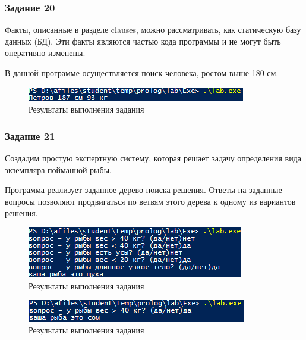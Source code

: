 \documentclass[14pt,a4paper,report]{report}
\begin{document}
\subsubsection{Задание 20}

Факты, описанные в разделе clauses, можно рассматривать, как статическую базу данных (БД). Эти факты являются частью кода программы и не могут быть оперативно изменены. 

В данной программе осуществляется поиск человека, ростом выше 180 см. 



\begin{figure}[h!]
	\centering
	\includegraphics[scale = 1.0]{images/d20.png}
	\caption{Результаты выполнения задания}
\end{figure}

\subsubsection{Задание 21}

Создадим простую экспертную систему, которая решает задачу определения вида экземпляра пойманной рыбы.

Программа реализует заданное дерево поиска решения. Ответы на заданные вопросы позволяют продвигаться по ветвям этого дерева к одному из вариантов решения.



\begin{figure}[h!]
	\centering
	\includegraphics[scale = 1.0]{images/d21_1.png}
	\caption{Результаты выполнения задания}
\end{figure}

\begin{figure}[h!]
	\centering
	\includegraphics[scale = 1.0]{images/d21_2.png}
	\caption{Результаты выполнения задания}
\end{figure}
\end{document}
